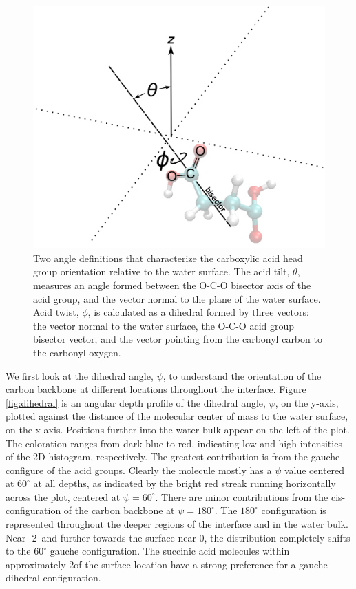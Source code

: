 \begin{figure}[h!]
	\begin{center}
		\includegraphics[scale=1.0]{images/bond-angles/bond-angle-definitions-small.png}
		\caption{Two angle definitions that characterize the carboxylic acid head group orientation relative to the water surface. The acid tilt, $\theta$, measures an angle formed between the O-C-O bisector axis of the acid group, and the vector normal to the plane of the water surface. Acid twist, $\phi$, is calculated as a dihedral formed by three vectors: the vector normal to the water surface, the O-C-O acid group bisector vector, and the vector pointing from the carbonyl carbon to the carbonyl oxygen.}
		\label{fig:angle-definitions}
	\end{center}
\end{figure}

We first look at the dihedral angle, $\psi$, to understand the orientation of the carbon backbone at different locations throughout the interface. Figure \ref{fig:dihedral} is an angular depth profile of the dihedral angle, $\psi$, on the y-axis, plotted against the distance of the molecular center of mass to the water surface, on the x-axis. Positions further into the water bulk appear on the left of the plot. The coloration ranges from dark blue to red, indicating low and high intensities of the 2D histogram, respectively. The greatest contribution is from the gauche configure of the acid groups. Clearly the molecule mostly has a $\psi$ value centered at $60^{\circ}$ at all depths, as indicated by the bright red streak running horizontally across the plot, centered at $\psi=60^{\circ}$. There are minor contributions from the cis-configuration of the carbon backbone at $\psi = 180^{\circ}$. The $180^{\circ}$ configuration is represented throughout the deeper regions of the interface and in the water bulk. Near -2\angs~and further towards the surface near 0\angs, the distribution completely shifts to the $60^{\circ}$ gauche configuration. The succinic acid molecules within approximately 2\angs of the surface location have a strong preference for a gauche dihedral configuration. 

